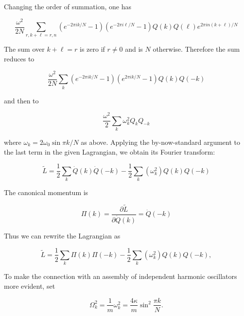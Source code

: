 Changing  the  order  of  summation,  one  has



\begin{equation}
\frac{\omega^2}{2N} \sum_{r, k + \ell = r, n}
(e^{-2\pi i k/N} - 1)
(e^{-2\pi i \ell/N} - 1)
Q(k) Q(\ell)  e^{2\pi i n(k + \ell) /N}
\end{equation}


The  sum  over   $k + \ell = r$  is  zero  if   $r \ne 0$  and  is   $N$  otherwise.   Therefore  the  sum  reduces  to



\begin{equation}
\frac{\omega^2}{2N}\sum_{k}
(e^{-2\pi i k/N} - 1)
(e^{2\pi i k/N} - 1)
Q(k) Q(-k)
\end{equation}


and  then  to



\begin{equation}
\frac{\omega^2}{2} \sum_{k}
\omega_k^2
Q_k Q_{-k}
\end{equation}


where   $\omega_k = 2\omega_0\sin \pi k/N$  as  above.   Applying  the  by-now-standard  argument  to  the  last  term  in  the  given  Lagrangian,  we  obtain  its  Fourier  transform:



\begin{equation}
\tilde L = \frac{1}{2}\sum_k \dot Q(k) \dot Q(-k)
-  \frac{1}{2}\sum_k (\omega_k^2)Q(k)Q(-k)
\end{equation}


The  canonical  momentum  is



\begin{equation}
\Pi(k) = \frac{\partial \tilde L}{\partial \dot Q(k)} = \dot Q(-k)
\end{equation}


Thus  we  can  rewrite  the  Lagrangian  as



\begin{equation}
\tilde L = \frac{1}{2} \sum_k \Pi(k)\Pi(-k) 
-  \frac{1}{2}\sum_k (\omega_k^2) Q(k) Q(-k),
\end{equation}


To  make  the  connection  with  an  assembly  of  independent  harmonic  oscillators  more  evident,  set



\begin{equation}
\Omega_k^2 = \frac{1}{m}\omega_k^2 = \frac{4\kappa}{m}\sin^2 \frac{\pi k}{N}.
\end{equation}


